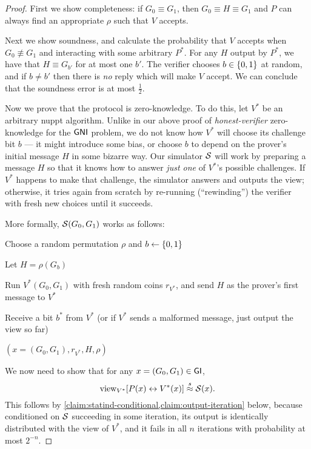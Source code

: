 \documentclass[11pt]{article}
\begin{document}
\begin{proof}
  First we show completeness: if $G_0 \equiv G_1$, then $G_0 \equiv H
  \equiv G_1$ and $P$ can always find an appropriate $\rho$ such that
  $V$ accepts.

  Next we show soundness, and calculate the probability that $V$
  accepts when $G_0 \not\equiv G_1$ and interacting with some
  arbitrary $P^{*}$.  For any $H$ output by $P^{*}$, we have that $H
  \equiv G_{b'}$ for at most one $b'$.  The verifier chooses $b \in
  \{0,1\}$ at random, and if $b\neq b'$ then there is \emph{no} reply
  which will make $V$ accept.  We can conclude that the soundness
  error is at most $\frac{1}{2}$.

  Now we prove that the protocol is zero-knowledge.  To do this, let
  $V^{*}$ be an arbitrary nuppt algorithm.  Unlike in our above proof
  of \emph{honest-verifier} zero-knowledge for the $\mathsf{GNI}$ problem, we
  do not know how $V^{*}$ will choose its challenge bit $b$ --- it
  might introduce some bias, or choose $b$ to depend on the prover's
  initial message $H$ in some bizarre way.  Our simulator $\mathcal{S}$ will
  work by preparing a message $H$ so that it knows how to answer
  \emph{just one} of $V^{*}$'s possible challenges.  If $V^{*}$
  happens to make that challenge, the simulator answers and outputs
  the view; otherwise, it tries again from scratch by re-running
  (``rewinding'') the verifier with fresh new choices until it
  succeeds.

  More formally, $\mathcal{S}(G_{0},G_{1})$ works as follows: 
  \begin{algorithmic}
    \REPEAT

    \STATE Choose a random permutation $\rho$ and $b \gets \{0,1\}$

    \STATE Let $H= \rho(G_b)$

    \STATE Run $V^*(G_{0}, G_{1})$ with fresh random coins $r_{V^*}$,
    and send $H$ as the prover's first message to $V^{*}$

    \STATE Receive a bit $b^{*}$ from $V^*$ (or if $V^{*}$ sends a
    malformed message, just output the view so far)


    \RETURN $(x = (G_{0}, G_{1}), r_{V^*}, H, \rho)$
  \end{algorithmic}

  We now need to show that for any $x = (G_{0},G_{1}) \in \mathsf{GI}$,
  \[ \text{view}_{V^{*}} [ P(x) \leftrightarrow V^{*}(x) ] \stackrel{s}{\approx}
    \mathcal{S}(x). \] This follows by
  \cref{claim:statind-conditional,claim:output-iteration} below,
  because conditioned on $\mathcal{S}$ succeeding in some iteration, its
  output is identically distributed with the view of $V^{*}$, and it
  fails in all $n$ iterations with probability at most $2^{-n}$.
\end{proof}
\end{document}
